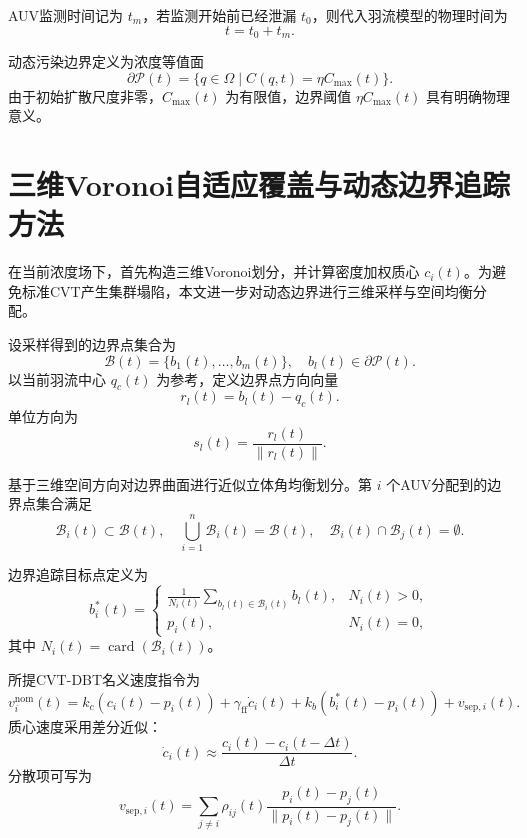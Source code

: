 \documentclass[conference]{IEEEtran}
\begin{document}
AUV监测时间记为 $t_m$，若监测开始前已经泄漏 $t_0$，则代入羽流模型的物理时间为
\begin{equation}
t=t_0+t_m.
\end{equation}

动态污染边界定义为浓度等值面
\begin{equation}
\partial\mathcal{P}(t)=
\{q\in\Omega\mid C(q,t)=\eta C_{\max}(t)\}.
\end{equation}
由于初始扩散尺度非零，$C_{\max}(t)$ 为有限值，边界阈值 $\eta C_{\max}(t)$ 具有明确物理意义。

\section{三维Voronoi自适应覆盖与动态边界追踪方法}
在当前浓度场下，首先构造三维Voronoi划分，并计算密度加权质心 $c_i(t)$。为避免标准CVT产生集群塌陷，本文进一步对动态边界进行三维采样与空间均衡分配。

设采样得到的边界点集合为
\begin{equation}
\mathcal{B}(t)=\{b_1(t),\ldots,b_m(t)\},\quad b_l(t)\in\partial\mathcal{P}(t).
\end{equation}
以当前羽流中心 $q_c(t)$ 为参考，定义边界点方向向量
\begin{equation}
r_l(t)=b_l(t)-q_c(t).
\end{equation}
单位方向为
\begin{equation}
s_l(t)=\frac{r_l(t)}{\|r_l(t)\|}.
\end{equation}

基于三维空间方向对边界曲面进行近似立体角均衡划分。第 $i$ 个AUV分配到的边界点集合满足
\begin{equation}
\mathcal{B}_i(t)\subset\mathcal{B}(t),\quad
\bigcup_{i=1}^{n}\mathcal{B}_i(t)=\mathcal{B}(t),\quad
\mathcal{B}_i(t)\cap\mathcal{B}_j(t)=\emptyset.
\end{equation}

边界追踪目标点定义为
\begin{equation}
b_i^{\ast}(t)=
\begin{cases}
\frac{1}{N_i(t)}\sum_{b_l(t)\in\mathcal{B}_i(t)}b_l(t), & N_i(t)>0,\\
p_i(t), & N_i(t)=0,
\end{cases}
\end{equation}
其中 $N_i(t)=\operatorname{card}(\mathcal{B}_i(t))$。

所提CVT-DBT名义速度指令为
\begin{equation}
v_i^{\mathrm{nom}}(t)
=
k_c(c_i(t)-p_i(t))
+\gamma_{\mathrm{ff}}\dot c_i(t)
+k_b(b_i^{\ast}(t)-p_i(t))
+v_{\mathrm{sep},i}(t).
\end{equation}
质心速度采用差分近似：
\begin{equation}
\dot c_i(t)\approx
\frac{c_i(t)-c_i(t-\Delta t)}{\Delta t}.
\end{equation}
分散项可写为
\begin{equation}
v_{\mathrm{sep},i}(t)
=
\sum_{j\neq i}
\rho_{ij}(t)
\frac{p_i(t)-p_j(t)}
{\|p_i(t)-p_j(t)\|}.
\end{equation}
\end{document}
